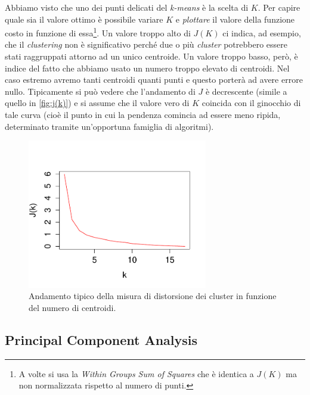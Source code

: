 Abbiamo visto che uno dei punti delicati del \emph{k-means} è la scelta di $K$. Per capire quale sia il valore ottimo è possibile variare $K$ e \emph{plottare} il valore della funzione costo in funzione di essa\footnote{A volte si usa la  \emph{Within Groups Sum of Squares} che è identica a $J(K)$ ma non normalizzata rispetto al numero di punti.}. Un valore troppo alto di $J(K)$ ci indica, ad esempio, che il \emph{clustering} non è significativo perché due o più \emph{cluster} potrebbero essere stati raggruppati attorno ad un unico centroide. Un valore troppo basso, però, è indice del fatto che abbiamo usato un numero troppo elevato di centroidi. Nel caso estremo avremo tanti centroidi quanti punti e questo porterà ad avere errore nullo. Tipicamente si può vedere che l'andamento di $J$ è decrescente (simile a quello in \autoref{fig:j(k)}) e si assume che il valore vero di $K$ coincida con il ginocchio di tale curva (cioè il punto in cui la pendenza comincia ad essere meno ripida, determinato tramite un'opportuna famiglia di algoritmi).

\begin{figure}[tbp]
\centering
  \includegraphics[width=0.7\textwidth]{images/jk}
  \caption{Andamento tipico della misura di distorsione dei cluster in funzione del numero di centroidi.}
  \label{fig:j(k)}
\end{figure}


\subsection{Principal Component Analysis}
